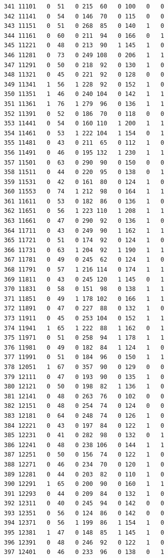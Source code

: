 \documentclass[
  letterpaper,
]{scrbook}
\begin{document}
\begin{verbatim}
341 11101   0  51   0 215  60   0 100   0   0
342 11141   0  54   0 146  70   0 115   0   0
343 11151   0  51   0 268  85   0 140   1   0
344 11161   0  60   0 211  94   0 166   0   1
345 11221   0  48   0 213  90   1 145   1   0
346 11281   0  73   0 249 108   0 206   1   1
347 11291   0  50   0 218  92   0 130   1   0
348 11321   0  45   0 221  92   0 128   0   0
349 11341   1  56   1 228  92   0 152   1   0
350 11351   1  46   0 240 104   0 142   1   1
351 11361   1  76   1 279  96   0 136   1   1
352 11391   0  52   0 186  70   0 118   0   0
353 11441   0  54   0 160 110   1 200   1   1
354 11461   0  53   1 222 104   1 154   0   1
355 11481   0  43   0 211  65   0 112   1   0
356 11491   0  46   0 195 132   1 230   1   1
357 11501   0  63   0 290  90   0 150   0   0
358 11511   0  44   0 220  95   0 138   0   1
359 11531   0  42   0 161  80   0 124   1   0
360 11553   0  74   1 212  98   0 164   1   1
361 11611   0  53   0 182  86   0 136   1   0
362 11651   0  56   1 223 110   1 208   1   1
363 11661   0  47   0 290  92   0 136   1   0
364 11711   0  43   0 249  90   1 162   1   1
365 11721   0  51   0 174  92   0 124   1   0
366 11731   0  63   1 204  92   1 190   1   1
367 11781   0  49   0 245  62   0 124   1   0
368 11791   0  57   1 216 114   0 174   1   1
369 11811   0  43   0 245 120   1 145   0   1
370 11831   0  58   0 151  98   0 138   1   1
371 11851   0  49   1 178 102   0 166   1   1
372 11891   0  47   0 227  88   0 132   1   0
373 11911   0  45   0 253 104   0 152   1   1
374 11941   1  65   1 222  88   1 162   0   1
375 11971   0  51   0 258  94   1 178   1   1
376 11981   0  49   0 182  84   1 124   1   0
377 11991   0  51   0 184  96   0 150   1   1
378 12051   1  67   0 357  90   0 129   0   0
379 12111   0  47   0 193  90   0 135   1   0
380 12121   0  50   0 198  82   1 136   1   0
381 12141   0  48   0 263  76   0 102   0   0
382 12151   0  48   0 254  74   0 124   0   0
383 12181   0  64   0 248  74   0 126   1   0
384 12221   0  43   0 197  84   0 122   1   0
385 12231   0  41   0 282  98   0 132   0   1
386 12241   0  48   0 238 106   0 144   1   1
387 12251   0  50   0 156  74   0 122   1   0
388 12271   0  46   0 234  70   0 120   1   0
389 12281   0  44   0 203  82   0 110   1   0
390 12291   1  65   0 200  90   0 160   1   1
391 12293   0  44   0 209  84   0 132   1   0
392 12311   0  40   0 245  94   0 142   0   0
393 12351   0  56   0 124  86   0 142   0   0
394 12371   0  56   1 199  86   1 154   1   0
395 12381   1  47   0 148  85   1 145   1   0
396 12391   0  48   0 246  92   0 122   1   0
397 12401   0  46   0 233  96   0 138   0   1

\end{verbatim}
\end{document}
